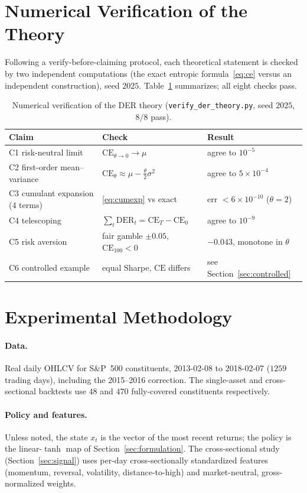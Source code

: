 \documentclass[11pt]{article}
\theoremstyle{definition}
\newcommand{\CE}{\mathrm{CE}}
\newcommand{\DER}{\mathrm{DER}}
\begin{document}
\section{Numerical Verification of the Theory}\label{sec:verify}

Following a verify-before-claiming protocol, each theoretical statement is checked by
two independent computations (the exact entropic formula~\eqref{eq:ce} versus an
independent construction), seed $2025$. Table~\ref{tab:verify} summarizes; all eight
checks pass.

\begin{table}[h]
\centering
\small
\begin{tabular}{lll}
\toprule
Claim & Check & Result \\
\midrule
C1 risk-neutral limit & $\CE_{\theta\to0}\!\to\!\mu$ & agree to $10^{-5}$ \\
C2 first-order mean--variance & $\CE_\theta\!\approx\!\mu-\tfrac\theta2\sigma^2$ & agree to $5\times10^{-4}$ \\
C3 cumulant expansion (4 terms) & \eqref{eq:cumexp} vs exact & err $<6\times10^{-10}$ ($\theta{=}2$) \\
C4 telescoping & $\sum_t\DER_t=\CE_T-\CE_0$ & agree to $10^{-9}$ \\
C5 risk aversion & fair gamble $\pm0.05$, $\CE_{100}<0$ & $-0.043$, monotone in $\theta$ \\
C6 controlled example & equal Sharpe, $\CE$ differs & see Section~\ref{sec:controlled} \\
\bottomrule
\end{tabular}
\caption{Numerical verification of the DER theory (\texttt{verify\_der\_theory.py},
seed $2025$, $8/8$ pass).}
\label{tab:verify}
\end{table}

\section{Experimental Methodology}\label{sec:method}

\paragraph{Data.} Real daily OHLCV for S\&P~500 constituents, 2013-02-08 to 2018-02-07
($1259$ trading days), including the 2015--2016 correction. The single-asset and
cross-sectional backtests use $48$ and $470$ fully-covered constituents respectively.

\paragraph{Policy and features.} Unless noted, the state $x_t$ is the vector of the
most recent returns; the policy is the linear-$\tanh$ map of
Section~\ref{sec:formulation}. The cross-sectional study (Section~\ref{sec:signal})
uses per-day cross-sectionally standardized features (momentum, reversal,
volatility, distance-to-high) and market-neutral, gross-normalized weights.
\end{document}
